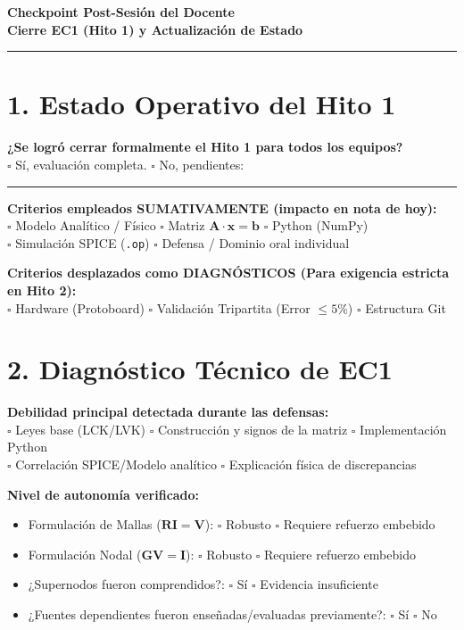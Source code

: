 \documentclass[11pt, a4paper]{article}
\begin{document}
\begin{center}
    {\LARGE \textbf{Checkpoint Post-Sesión del Docente}} \\[0.2cm]
    {\large \textbf{Cierre EC1 (Hito 1) y Actualización de Estado}}
\end{center}
\hrule
\vspace{0.5cm}

\section*{1. Estado Operativo del Hito 1}
\textbf{¿Se logró cerrar formalmente el Hito 1 para todos los equipos?} \\
$\square$ Sí, evaluación completa. \quad $\square$ No, pendientes: \rule{6cm}{0.4pt}

\vspace{0.2cm}
\textbf{Criterios empleados SUMATIVAMENTE (impacto en nota de hoy):} \\
$\square$ Modelo Analítico / Físico \quad $\square$ Matriz $\mathbf{A}\cdot\mathbf{x}=\mathbf{b}$ \quad $\square$ Python (NumPy) \\
$\square$ Simulación SPICE (\texttt{.op}) \quad $\square$ Defensa / Dominio oral individual

\vspace{0.2cm}
\textbf{Criterios desplazados como DIAGNÓSTICOS (Para exigencia estricta en Hito 2):} \\
$\square$ Hardware (Protoboard) \quad $\square$ Validación Tripartita (Error $\le 5\%$) \quad $\square$ Estructura Git

\section*{2. Diagnóstico Técnico de EC1}
\textbf{Debilidad principal detectada durante las defensas:} \\
$\square$ Leyes base (LCK/LVK) \quad $\square$ Construcción y signos de la matriz \quad $\square$ Implementación Python \\
$\square$ Correlación SPICE/Modelo analítico \quad $\square$ Explicación física de discrepancias

\vspace{0.3cm}
\textbf{Nivel de autonomía verificado:}
\begin{itemize}
    \item Formulación de Mallas ($\mathbf{R}\mathbf{I}=\mathbf{V}$): \quad $\square$ Robusto \quad $\square$ Requiere refuerzo embebido
    \item Formulación Nodal ($\mathbf{G}\mathbf{V}=\mathbf{I}$): \quad $\square$ Robusto \quad $\square$ Requiere refuerzo embebido
    \item ¿Supernodos fueron comprendidos?: \quad $\square$ Sí \quad $\square$ Evidencia insuficiente
    \item ¿Fuentes dependientes fueron enseñadas/evaluadas previamente?: \quad $\square$ Sí \quad $\square$ No
\end{itemize}
\end{document}

